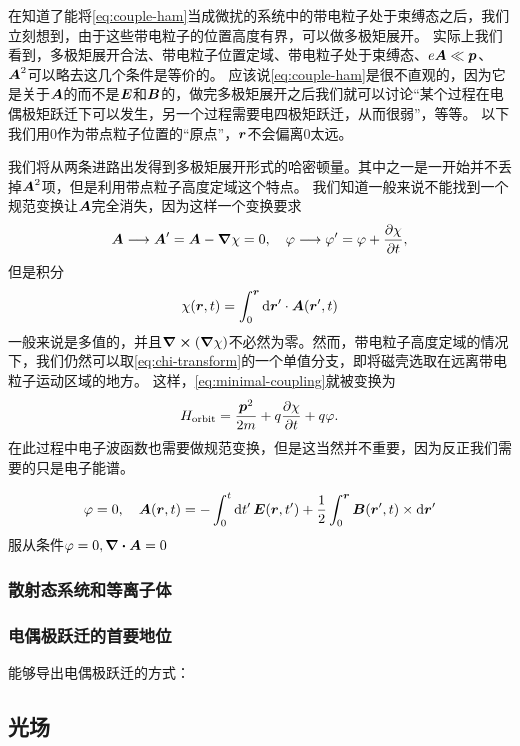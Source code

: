 \documentclass[UTF8, a4paper]{ctexart}
\begin{document}
在知道了能将\eqref{eq:couple-ham}当成微扰的系统中的带电粒子处于束缚态之后，我们立刻想到，由于这些带电粒子的位置高度有界，可以做多极矩展开。
实际上我们看到，多极矩展开合法、带电粒子位置定域、带电粒子处于束缚态、$e \vb*{A} \ll \vb*{p}$、$\vb*{A}^2$可以略去这几个条件是等价的。
应该说\eqref{eq:couple-ham}是很不直观的，因为它是关于$\vb*{A}$的而不是$\vb*{E}$和$\vb*{B}$的，做完多极矩展开之后我们就可以讨论“某个过程在电偶极矩跃迁下可以发生，另一个过程需要电四极矩跃迁，从而很弱”，等等。
以下我们用$0$作为带点粒子位置的“原点”，$\vb*{r}$不会偏离$0$太远。

我们将从两条进路出发得到多极矩展开形式的哈密顿量。其中之一是一开始并不丢掉$\vb*{A}^2$项，但是利用带点粒子高度定域这个特点。
我们知道一般来说不能找到一个规范变换让$\vb*{A}$完全消失，因为这样一个变换要求
\[
    \vb*{A} \longrightarrow \vb*{A}' = \vb*{A} - \grad{\chi} = 0, \quad \varphi \longrightarrow \varphi' = \varphi + \pdv{\chi}{t},
\]
但是积分
\begin{equation}
    \chi(\vb*{r}, t) = \int_0^{\vb*{r}} \dd{\vb*{r}'} \cdot \vb*{A}(\vb*{r}', t)
    \label{eq:chi-transform}
\end{equation}
一般来说是多值的，并且$\curl{(\grad{\chi})}$不必然为零。然而，带电粒子高度定域的情况下，我们仍然可以取\eqref{eq:chi-transform}的一个单值分支，即将磁壳选取在远离带电粒子运动区域的地方。
这样，\eqref{eq:minimal-coupling}就被变换为
\[
    H_\text{orbit} = \frac{\vb*{p}^2}{2m} + q \pdv{\chi}{t} + q \varphi.
\]
在此过程中电子波函数也需要做规范变换，但是这当然并不重要，因为反正我们需要的只是电子能谱。


\begin{equation}
    \varphi = 0, \quad \vb*{A}(\vb*{r}, t) = - \int_0^t \dd{t'} \vb*{E}(\vb*{r}, t') + \frac{1}{2} \int_0^{\vb*{r}} \vb*{B}(\vb*{r}', t) \times \dd{\vb*{r}'}
\end{equation}
服从条件$\varphi=0, \div{\vb*{A}}=0$

\subsubsection{散射态系统和等离子体}

\subsubsection{电偶极跃迁的首要地位}

能够导出电偶极跃迁的方式：

\subsection{光场}
\end{document}
